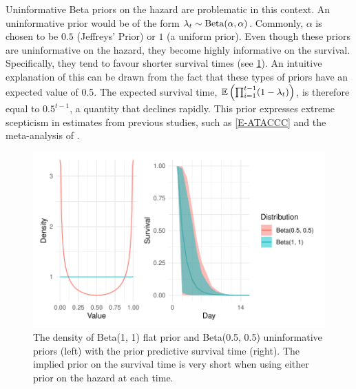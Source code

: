 \documentclass[thesis.tex]{subfiles}
\begin{document}
Uninformative Beta priors on the hazard are problematic in this context.
An uninformative prior would be of the form $\lambda_t \sim \operatorname{Beta}(\alpha, \alpha)$.
Commonly, $\alpha$ is chosen to be $0.5$ (Jeffreys' Prior) or $1$ (a uniform prior).
Even though these priors are uninformative on the hazard, they become highly informative on the survival. 
Specifically, they tend to favour shorter survival times (see \cref{perf-test:fig:flat-prior}).
An intuitive explanation of this can be drawn from the fact that these types of priors have an expected value of 0.5.
The expected survival time, $\operatorname{\mathbb{E}} \left( \prod_{i=1}^{t-1} (1-\lambda_t) \right)$, is therefore equal to $0.5^{t-1}$, a quantity that declines rapidly.
This prior expresses extreme scepticism in estimates from previous studies, such as \cref{E-ATACCC} and the meta-analysis of \textcite{cevikShedding}.
\begin{figure}
  \centering \includegraphics{cis-perfect-testing/flat-prior}
  \caption[Uninformative priors for the hazard]{The density of Beta(1, 1) flat prior and Beta(0.5, 0.5) uninformative priors (left) with the prior predictive survival time (right). The implied prior on the survival time is very short when using either prior on the hazard at each time. \label{perf-test:fig:flat-prior}}
\end{figure}
\end{document}
